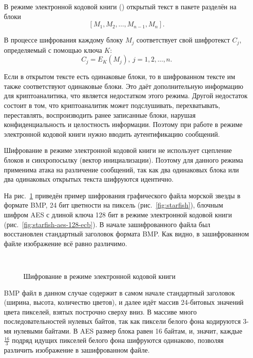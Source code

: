В режиме электронной кодовой книги () открытый текст в пакете разделён на блоки
    \[ \left[ M_1, M_2, \dots, M_{n-1}, M_n \right]. \]

В процессе шифрования каждому блоку $M_j$ соответствует свой шифротекст $C_j$, определяемый с помощью ключа $K$:
    \[ C_j = E_K(M_j), ~ j = 1, 2, \dots, n. \]

Если в открытом тексте есть одинаковые блоки, то в шифрованном тексте им также соответствуют одинаковые блоки. Это даёт дополнительную информацию для криптоаналитика, что является недостатком этого режима. Другой недостаток состоит в том, что криптоаналитик может подслушивать, перехватывать, переставлять, воспроизводить ранее записанные блоки, нарушая конфиденциальность и целостность информации. Поэтому при работе в режиме электронной кодовой книги нужно вводить аутентификацию сообщений.

Шифрование в режиме электронной кодовой книги не использует сцепление блоков и синхропосылку (вектор инициализации). Поэтому для данного режима применима атака на различение сообщений, так как два одинаковых блока или два одинаковых открытых текста шифруются идентично.

На рис.~\ref{fig:ecb-demo} приведён пример шифрования графического файла морской звезды в формате BMP, 24 бит цветности на пиксель (рис.~\ref{fig:starfish}), блочным шифром AES с длиной ключа 128 бит в режиме электронной кодовой книги (рис.~\ref{fig:starfish-aes-128-ecb}). В начале зашифрованного файла был восстановлен стандартный заголовок формата BMP. Как видно, в зашифрованном файле изображение всё равно различимо.
\begin{figure}[!ht]
    \centering
    ~~~
    \caption{Шифрование в режиме электронной кодовой книги\label{fig:ecb-demo}}
\end{figure}
BMP файл в данном случае содержит в самом начале стандартный заголовок (ширина, высота, количество цветов), и далее идёт массив 24-битовых значений цвета пикселей, взятых построчно сверху вниз. В массиве много последовательностей нулевых байтов, так как пиксели белого фона кодируются 3-мя нулевыми байтами. В AES размер блока равен 16 байтам, и, значит, каждые $\frac{16}{3}$ подряд идущих пикселей белого фона шифруются одинаково, позволяя различить изображение в зашифрованном файле.

